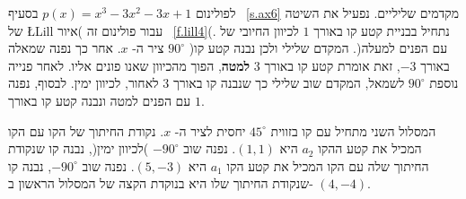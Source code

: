 לפולינום 
$p(x)=x^3-3x^2-3x+1$
בסעיף%
~\ref{s.ax6}
מקדמים שליליים. נפעיל את השיטה של 
\L{Lill}
עבור פולינום זה )איור~%
\ref{f.lill4}(.
נתחיל בבניית קטע קו באורך
$1$
לכיוון החיובי של ציר ה-%
$x$. 
אחר כך נפנה שמאלה
$90^\circ$
)עם הפנים למעלה(. המקדם שלילי ולכן נבנה קטע קו באורך 
$-3$,
זאת אומרת קטע קו באורך
$3$
\textbf{למטה},
הפוך מהכיוון שאנו פונים אליו. לאחר פנייה נוספת
$90^\circ$
לשמאל, המקדם שוב שלילי כך שנבנה קו באורך
$3$
לאחור, לכיוון ימין. לבסוף, נפנה עם הפנים למטה ונבנה קטע קו באורך
$1$.

המסלול השני מתחיל עם קו בזווית
$45^\circ$
יחסית לציר ה-%
$x$.
נקודת החיתוך של הקו עם הקו המכיל את קטע ההקו
$a_2$
היא
$(1,1)$.
נפנה שוב
$-90^\circ$
)לכיוון ימין(, נבנה קו שנקודת החיתוך שלה עם הקו המכיל את קטע הקו 
$a_1$
היא
$(5,-3)$.
נפנה שוב
 $-90^\circ$,
נבנה קו שנקודת החיתוך שלו היא בנוקדת הקצה של המסלול הראשון ב-%
$(4,-4)$.

